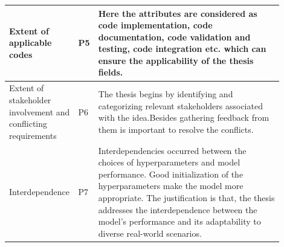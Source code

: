 \documentclass[a4paper,12pt,oneside]{book}
\begin{document}
\begin{table}[!htb]
\begin{threeparttable}
\begin{tabular}{|p{0.20\linewidth}|p{0.03\linewidth}|p{0.67\linewidth}|}
 Extent of applicable codes & P5 &
 Here the attributes are considered as code implementation, code documentation, code validation and testing, code integration etc. which can ensure the applicability of the thesis fields.
 \\ \hline

 Extent of stakeholder involvement and conflicting requirements & P6 &
 The thesis begins by identifying and categorizing relevant stakeholders associated with the idea.Besides gathering feedback from them is important to resolve the conflicts.
 \\ \hline




Interdependence & P7 & 
Interdependencies occurred  between the choices of hyperparameters and model performance. Good initialization of the hyperparameters make the model more appropriate. The justification is that, the thesis addresses the interdependence between the model's performance and its adaptability to diverse real-world scenarios. \\ \hline
\end{tabular}

\end{threeparttable}
\end{table}

\newpage
\end{document}
